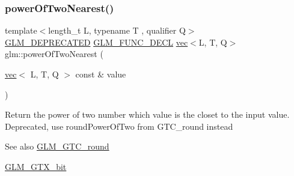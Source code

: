 \subsubsection{\texorpdfstring{power\+Of\+Two\+Nearest()}{powerOfTwoNearest()}\hspace{0.1cm}{\footnotesize\ttfamily [2/2]}}
{\footnotesize\ttfamily template$<$length\+\_\+t L, typename T , qualifier Q$>$ \\
\mbox{\hyperlink{setup_8hpp_a8edfb48cdc249a3ee48406bf179023dc}{G\+L\+M\+\_\+\+D\+E\+P\+R\+E\+C\+A\+T\+ED}} \mbox{\hyperlink{setup_8hpp_ab2d052de21a70539923e9bcbf6e83a51}{G\+L\+M\+\_\+\+F\+U\+N\+C\+\_\+\+D\+E\+CL}} \mbox{\hyperlink{structglm_1_1vec}{vec}}$<$L, T, Q$>$ glm\+::power\+Of\+Two\+Nearest (\begin{DoxyParamCaption}\item[{\mbox{\hyperlink{structglm_1_1vec}{vec}}$<$ L, T, Q $>$ const \&}]{value }\end{DoxyParamCaption})}

Return the power of two number which value is the closet to the input value. Deprecated, use round\+Power\+Of\+Two from G\+T\+C\+\_\+round instead

\begin{DoxySeeAlso}{See also}
\mbox{\hyperlink{group__gtc__round}{G\+L\+M\+\_\+\+G\+T\+C\+\_\+round}} 

\mbox{\hyperlink{group__gtx__bit}{G\+L\+M\+\_\+\+G\+T\+X\+\_\+bit}} 
\end{DoxySeeAlso}
